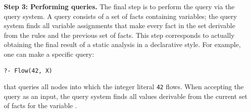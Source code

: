 \smallskip
\textbf{Step 3: Performing queries.}
The final step is to perform the query via the query system.  A query consists
of a set of facts containing variables; the query system finds all variable
assignments that make every fact in the set derivable from the rules and
the previous set of facts.  This step corresponds to actually obtaining the
final result of a static analysis in a declarative style.
For example, one can make a specific query:

\begin{lstlisting}[style=mrule]
?- Flow(42, X)
\end{lstlisting}

\noindent
that queries all nodes into which the integer literal {\tt 42} flows.
When accepting the query as an input, the query system finds all values
derivable from the current set of facts for the variable .

